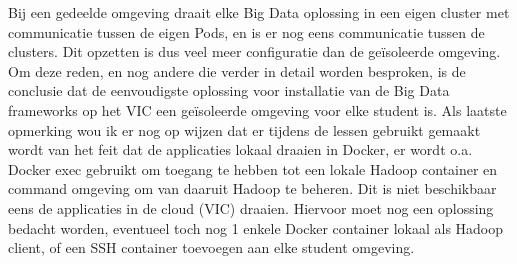 Bij een gedeelde omgeving draait elke Big Data oplossing in een eigen cluster met communicatie tussen de eigen Pods, en is er nog eens communicatie tussen de clusters. Dit opzetten is dus veel meer configuratie dan de geïsoleerde omgeving.
\newline
Om deze reden, en nog andere die verder in detail worden besproken, is de conclusie dat de eenvoudigste oplossing voor installatie van de Big Data frameworks op het VIC een geïsoleerde omgeving voor elke student is.
\newline
\newline
Als laatste opmerking wou ik er nog op wijzen dat er tijdens de lessen gebruikt gemaakt wordt van het feit dat de applicaties lokaal draaien in Docker, er wordt o.a. Docker exec gebruikt om toegang te hebben tot een lokale Hadoop container en command omgeving om van daaruit Hadoop te beheren. Dit is niet beschikbaar eens de applicaties in de cloud (VIC) draaien. Hiervoor moet nog een oplossing bedacht worden, eventueel toch nog 1 enkele Docker container lokaal als Hadoop client, of een SSH container toevoegen aan elke student omgeving.
\newline
